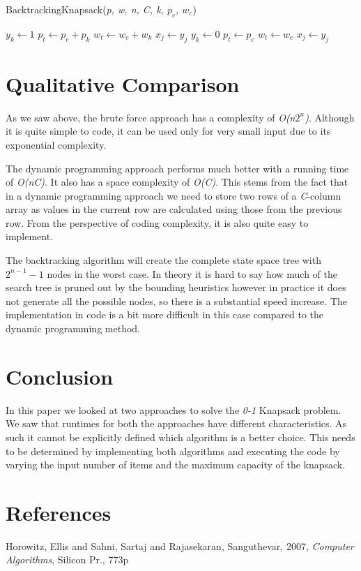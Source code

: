 \documentclass{article}
\begin{document}
\begin{algorithm}
	\caption{BacktrackingKnapsack(\textit{p, w, n, C, k, $p_{c}$, $w_{c}$})}\label{backtrackingKnapsack}
	\begin{algorithmic}[1]
			\State $y_{k} \gets 1$
				\State {}
			\EndIf
				\State $p_{t} \gets p_{c} + p_{k}$
				\State $w_{t} \gets w_{c} + w_{k}$
					\State $x_{j} \gets y_{j}$
				\EndFor
			\EndIf
		\EndIf
			\State $y_{k} \gets 0$
				\State {}
			\EndIf
				\State $p_{t} \gets p_{c}$
				\State $w_{t} \gets w_{c}$
					\State $x_{j} \gets y_{j}$
				\EndFor
			\EndIf
		\EndIf
		
	\end{algorithmic}		
\end{algorithm}

\section{Qualitative Comparison}
As we saw above, the brute force approach has a complexity of \textit{O(n$2^{n}$)}. Although it is quite simple to code, it can be used only for very small input due to its exponential complexity. 

The dynamic programming approach performs much better with a running time of \textit{O(nC)}. It also has a space complexity of \textit{O(C)}. This stems from the fact that in a dynamic programming approach we need to store two rows of a \textit{C}-column array as values in the current row are calculated using those from the previous row. From the perspective of coding complexity, it is also quite easy to implement.

The backtracking algorithm will create the complete state space tree with $2^{n-1}-1$ nodes in the worst case. In theory it is hard to say how much of the search tree is pruned out by the bounding heuristics however in practice it does not generate all the possible nodes, so there is a substantial speed increase. The implementation in code is a bit more difficult in this case compared to the dynamic programming method.

\section{Conclusion}
In this paper we looked at two approaches to solve the \textit{0-1} Knapsack problem. We saw that runtimes for both the approaches have different characteristics. As such it cannot be explicitly defined which algorithm is a better choice. This needs to be determined by implementing both algorithms and executing the code by varying the input number of items and the maximum capacity of the knapsack.

\section{References}
Horowitz, Ellis and Sahni, Sartaj and Rajasekaran, Sanguthevar, 2007, \textit{Computer Algorithms}, Silicon Pr., 773p
\end{document}
